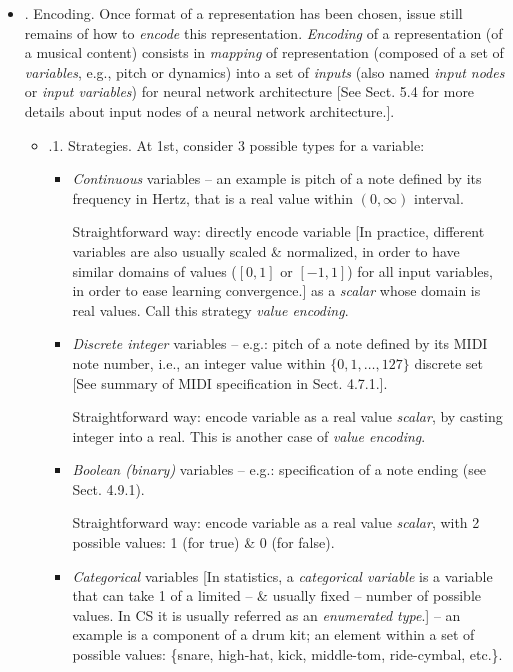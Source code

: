 \documentclass{article}
\begin{document}
\begin{itemize}
\begin{itemize}
\begin{itemize}
		\end{itemize}
		\item {. Encoding.} Once format of a representation has been chosen, issue still remains of how to {\it encode} this representation. {\it Encoding} of a representation (of a musical content) consists in {\it mapping} of representation (composed of a set of {\it variables}, e.g., pitch or dynamics) into a set of {\it inputs} (also named {\it input nodes} or {\it input variables}) for neural network architecture [See Sect. 5.4 for more details about input nodes of a neural network architecture.].
		\begin{itemize}
			\item {.1. Strategies.} At 1st, consider 3 possible types for a variable:
			\begin{itemize}
				\item {\it Continuous} variables -- an example is pitch of a note defined by its frequency in Hertz, that is a real value within $(0,\infty)$ interval.

				Straightforward way: directly encode variable [In practice, different variables are also usually scaled \& normalized, in order to have similar domains of values ($[0,1]$ or $[-1,1]$) for all input variables, in order to ease learning convergence.] as a {\it scalar} whose domain is real values. Call this strategy {\it value encoding}.
				\item {\it Discrete integer} variables -- e.g.: pitch of a note defined by its MIDI note number, i.e., an integer value within $\{0,1,\ldots,127\}$ discrete set [See summary of MIDI specification in Sect. 4.7.1.].

				Straightforward way: encode variable as a real value {\it scalar}, by casting integer into a real. This is another case of {\it value encoding}.
				\item {\it Boolean (binary)} variables -- e.g.: specification of a note ending (see Sect. 4.9.1).

				Straightforward way: encode variable as a real value {\it scalar}, with 2 possible values: 1 (for true) \& 0 (for false).
				\item {\it Categorical} variables [In statistics, a {\it categorical variable} is a variable that can take 1 of a limited -- \& usually fixed -- number of possible values. In CS it is usually referred as an {\it enumerated type}.] -- an example is a component of a drum kit; an element within a set of possible values: \{snare, high-hat, kick, middle-tom, ride-cymbal, etc.\}.


\end{itemize}
\end{itemize}
\end{itemize}
\end{itemize}
\end{document}
